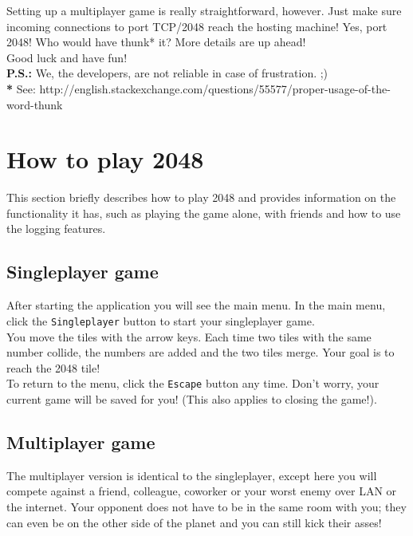 \documentclass[a4paper,11pt,report]{scrartcl}
\begin{document}
Setting up a multiplayer game is really straightforward, however. Just make sure incoming connections to port TCP/2048 reach the hosting machine! Yes, port 2048! Who would have thunk* it? More details are up ahead!\\

Good luck and have fun!\\

\textbf{P.S.:} We, the developers, are not reliable in case of frustration. ;)\\

\textbf{*} See: http://english.stackexchange.com/questions/55577/proper-usage-of-the-word-thunk

\newpage\section{How to play 2048}

This section briefly describes how to play 2048 and provides information on
the functionality it has, such as playing the game alone, with friends and how
to use the logging features.\\

\subsection{Singleplayer game}
After starting the application you will see the main menu. In the main menu,
click the \texttt{Singleplayer} button to start your singleplayer game.\\

You move the tiles with the arrow keys. Each time two tiles with the same
number collide, the numbers are added and the two tiles merge. Your goal is to
reach the 2048 tile!\\

To return to the menu, click the \texttt{Escape} button any time. Don't worry,
your current game will be saved for you! (This also applies to closing the
game!).

\subsection{Multiplayer game}
The multiplayer version is identical to the singleplayer, except here you will
compete against a friend, colleague, coworker or your worst enemy over LAN or
the internet. Your opponent does not have to be in the same room with you; they
can even be on the other side of the planet and you can still kick their
asses!\\
\end{document}
